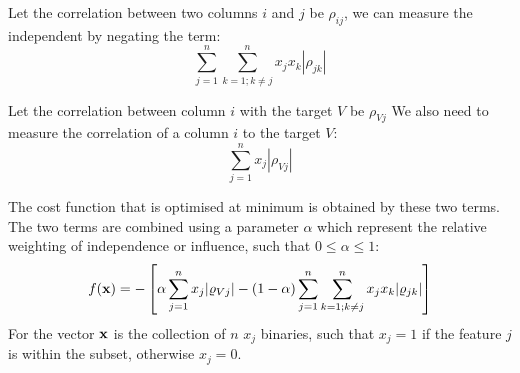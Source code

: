 Let the correlation between two columns $i$ and $j$ be $\rho_{ij}$, we can measure the independent by negating the term:
\begin{equation}
    \sum^n_{j=1} \sum^n_{k=1; k\neq j} x_j x_k |\rho_{jk}|
\end{equation}

Let the correlation between column $i$ with the target $V$ be $\rho_{Vj}$
We also need to measure the correlation of a column $i$ to the target $V$:
\begin{equation}
    \sum^n_{j=1} x_j |\rho_{Vj}|
\end{equation}

The cost function that is optimised at minimum is obtained by these two terms.
The two terms are combined using a parameter $\alpha$ which represent the relative weighting of independence or influence, such that $0 \leq \alpha \leq 1$:
\begin{equation}
    f(\textbf{\text{x}}) = 
    - \left[
        \alpha \sum^n_{j=1} x_j |\rho_{Vj}| 
        -(1-\alpha) \sum^n_{j=1} \sum^n_{k=1; k\neq j} x_j x_k |\rho_{jk}|
    \right]
\end{equation}
For the vector $\textbf{\text{x}}$ is the collection of $n$ $x_j$ binaries, such that $x_j=1$ if the feature $j$ is within the subset, otherwise $x_j=0$.
